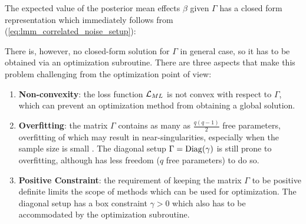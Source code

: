 \documentclass[11pt,letterpaper]{article}
\numberwithin{equation}{section} %
\numberwithin{figure}{section} %
\numberwithin{table}{section} %
\begin{document}



The expected value of the posterior mean effects $\beta$ given $\Gamma$ has a closed form representation which immediately follows from (\ref{eq:lmm_correlated_noise_setup}):



There is, however, no closed-form solution for $\Gamma$ in general case, so it has to be obtained via an optimization subroutine. There are three aspects that make this problem challenging from the optimization point of view:

\begin{enumerate}
	\item \textbf{Non-convexity}: the loss function $\operatorname{\mathcal{L}}_{ML}$ is not convex with respect to $\Gamma$, which can prevent an optimization method from obtaining a global solution.
	\item \textbf{Overfitting}: the matrix $\Gamma$ contains as many as $\frac{q(q-1)}{2}$ free parameters, overfitting of which may result in near-singularities, especially when the sample size is small \cite{Lange1989}. The diagonal setup $\Gamma = \operatorname{Diag}(\gamma)$ is still prone to overfitting, although has less freedom ($q$ free parameters) to do so.
	\item \textbf{Positive Constraint}: the requirement of keeping the matrix $\Gamma$ to be positive definite limits the scope of methods which can be used for optimization. The diagonal setup has a box constraint $\gamma > 0$ which also has to be accommodated by the optimization subroutine.
\end{enumerate}
\end{document}
